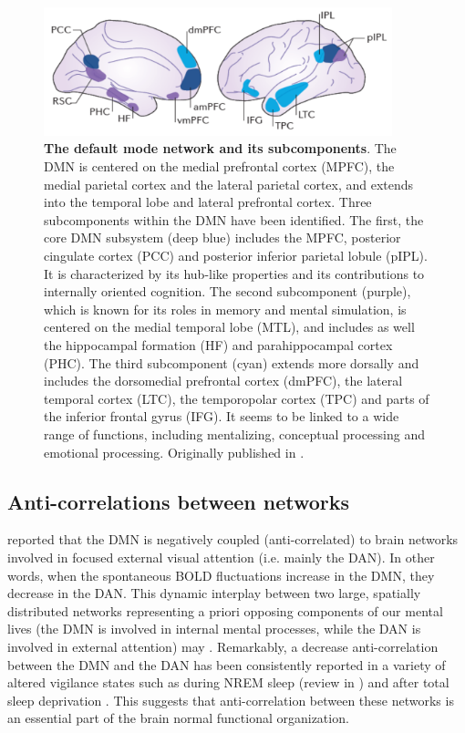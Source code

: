 \begin{figure}[htb]
    \centering
	\includegraphics[width=0.9\textwidth]{Fig/Methods/fMRI_DMN/Intro_DMN.png}
	\caption[The default mode network and its subcomponents]{\textbf{The default mode network and its subcomponents}. The DMN is centered on the medial prefrontal cortex (MPFC), the medial parietal cortex and the lateral parietal cortex, and extends into the temporal lobe and lateral prefrontal cortex. Three subcomponents within the DMN have been identified. The first, the core DMN subsystem (deep blue) includes the MPFC, posterior cingulate cortex (PCC) and posterior inferior parietal lobule (pIPL). It is characterized by its hub-like properties and its contributions to internally oriented cognition. The second subcomponent (purple), which is known for its roles in memory and mental simulation, is centered on the medial temporal lobe (MTL), and includes as well the hippocampal formation (HF) and parahippocampal cortex (PHC). The third subcomponent (cyan) extends more dorsally and includes the dorsomedial prefrontal cortex (dmPFC), the lateral temporal cortex (LTC), the temporopolar cortex (TPC) and parts of the inferior frontal gyrus (IFG). It seems to be linked to a wide range of functions, including mentalizing, conceptual processing and emotional processing. Originally published in \citet{christoff_mind-wandering_2016}.}
	\label{fig:methods:dmn}
\end{figure}

\subsection{Anti-correlations between networks}
\label{sec:fmri:fc:anti-correl}

\citet{fox_human_2005} reported that the DMN is negatively coupled (anti-correlated) to brain networks involved in focused external visual attention (i.e. mainly the DAN). In other words, when the spontaneous BOLD fluctuations increase in the DMN, they decrease in the DAN. This dynamic interplay between two large, spatially distributed networks representing a priori opposing components of our mental lives (the DMN is involved in internal mental processes, while the DAN is involved in external attention) may  \citep{buckner_opportunities_2013}. Remarkably, a decrease anti-correlation between the DMN and the DAN has been consistently reported in a variety of altered vigilance states such as during NREM sleep (review in \citealp{picchioni_sleep_2013}) and after total sleep deprivation \citep{de_havas_sleep_2012}. This suggests that anti-correlation between these networks is an essential part of the brain normal functional organization.


